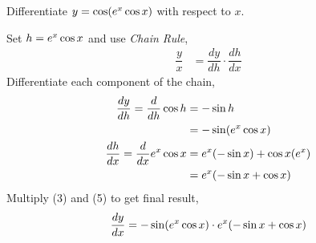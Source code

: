 

\question[3] Differentiate $y=\cos(e^x\cos x)$ with respect to $x$.

\insertQR{}

\watchout


\begin{solution}[\mcq]
  Set $h=e^x\cos x$ and use \textit{Chain Rule},
  \begin{align}
    \dfrac{y}{x} &= \dfrac{dy}{dh}\cdot\dfrac{dh}{dx}
  \end{align}
  Differentiate each component of the chain,
  \begin{align}
    \dfrac{dy}{dh}=\dfrac{d}{dh} \cos h
                 &= -\sin h \\
                 &= -\sin(e^x\cos x) \\
    \dfrac{dh}{dx}=\dfrac{d}{dx}e^x\cos x
                 &= e^x(-\sin x) + \cos x(e^x)\\
                 &= e^x(-\sin x+ \cos x)
  \end{align}
  Multiply (3) and (5) to get final result,
  \begin{align}
    \dfrac{dy}{dx} = -\sin(e^x\cos x)\cdot e^x(-\sin x+ \cos x)
  \end{align}
\end{solution}

